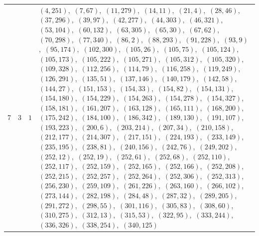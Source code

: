 \documentclass[11pt]{article}
\begin{document}
{\begin{longtable}{@{}rrl>{\raggedright\arraybackslash}p{}@{}}
7 & 3 & $1$ & $(4,251)$,\allowbreak\ $(7,67)$,\allowbreak\ $(11,279)$,\allowbreak\ $(14,11)$,\allowbreak\ $(21,4)$,\allowbreak\ $(28,46)$,\allowbreak\ $(37,296)$,\allowbreak\ $(39,97)$,\allowbreak\ $(42,277)$,\allowbreak\ $(44,303)$,\allowbreak\ $(46,321)$,\allowbreak\ $(53,104)$,\allowbreak\ $(60,132)$,\allowbreak\ $(63,305)$,\allowbreak\ $(65,30)$,\allowbreak\ $(67,62)$,\allowbreak\ $(70,298)$,\allowbreak\ $(77,340)$,\allowbreak\ $(86,2)$,\allowbreak\ $(88,293)$,\allowbreak\ $(91,228)$,\allowbreak\ $(93,9)$,\allowbreak\ $(95,174)$,\allowbreak\ $(102,300)$,\allowbreak\ $(105,26)$,\allowbreak\ $(105,75)$,\allowbreak\ $(105,124)$,\allowbreak\ $(105,173)$,\allowbreak\ $(105,222)$,\allowbreak\ $(105,271)$,\allowbreak\ $(105,312)$,\allowbreak\ $(105,320)$,\allowbreak\ $(109,328)$,\allowbreak\ $(112,256)$,\allowbreak\ $(114,79)$,\allowbreak\ $(116,258)$,\allowbreak\ $(119,249)$,\allowbreak\ $(126,291)$,\allowbreak\ $(135,51)$,\allowbreak\ $(137,146)$,\allowbreak\ $(140,179)$,\allowbreak\ $(142,58)$,\allowbreak\ $(144,27)$,\allowbreak\ $(151,153)$,\allowbreak\ $(154,33)$,\allowbreak\ $(154,82)$,\allowbreak\ $(154,131)$,\allowbreak\ $(154,180)$,\allowbreak\ $(154,229)$,\allowbreak\ $(154,263)$,\allowbreak\ $(154,278)$,\allowbreak\ $(154,327)$,\allowbreak\ $(158,181)$,\allowbreak\ $(161,207)$,\allowbreak\ $(163,128)$,\allowbreak\ $(165,111)$,\allowbreak\ $(168,200)$,\allowbreak\ $(175,242)$,\allowbreak\ $(184,100)$,\allowbreak\ $(186,342)$,\allowbreak\ $(189,130)$,\allowbreak\ $(191,107)$,\allowbreak\ $(193,223)$,\allowbreak\ $(200,6)$,\allowbreak\ $(203,214)$,\allowbreak\ $(207,34)$,\allowbreak\ $(210,158)$,\allowbreak\ $(212,177)$,\allowbreak\ $(214,307)$,\allowbreak\ $(217,151)$,\allowbreak\ $(224,193)$,\allowbreak\ $(233,149)$,\allowbreak\ $(235,195)$,\allowbreak\ $(238,81)$,\allowbreak\ $(240,156)$,\allowbreak\ $(242,76)$,\allowbreak\ $(249,202)$,\allowbreak\ $(252,12)$,\allowbreak\ $(252,19)$,\allowbreak\ $(252,61)$,\allowbreak\ $(252,68)$,\allowbreak\ $(252,110)$,\allowbreak\ $(252,117)$,\allowbreak\ $(252,159)$,\allowbreak\ $(252,165)$,\allowbreak\ $(252,166)$,\allowbreak\ $(252,208)$,\allowbreak\ $(252,215)$,\allowbreak\ $(252,257)$,\allowbreak\ $(252,264)$,\allowbreak\ $(252,306)$,\allowbreak\ $(252,313)$,\allowbreak\ $(256,230)$,\allowbreak\ $(259,109)$,\allowbreak\ $(261,226)$,\allowbreak\ $(263,160)$,\allowbreak\ $(266,102)$,\allowbreak\ $(273,144)$,\allowbreak\ $(282,198)$,\allowbreak\ $(284,48)$,\allowbreak\ $(287,32)$,\allowbreak\ $(289,205)$,\allowbreak\ $(291,272)$,\allowbreak\ $(298,55)$,\allowbreak\ $(301,116)$,\allowbreak\ $(305,83)$,\allowbreak\ $(308,60)$,\allowbreak\ $(310,275)$,\allowbreak\ $(312,13)$,\allowbreak\ $(315,53)$,\allowbreak\ $(322,95)$,\allowbreak\ $(333,244)$,\allowbreak\ $(336,326)$,\allowbreak\ $(338,254)$,\allowbreak\ $(340,125)$\\

\end{longtable}}
\end{document}

